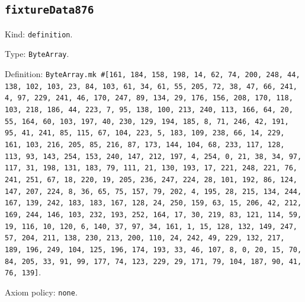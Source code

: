 \documentclass[11pt]{article}
\begin{document}
\subsection*{\texttt{fixtureData876}}
\noindent Kind: \texttt{definition}.\par
\noindent Type: \texttt{ByteArray}.\par
\noindent Definition: \texttt{ByteArray.mk \#[161, 184, 158, 198, 14, 62, 74, 200, 248, 44, 138, 102, 103, 23, 84, 103, 61, 34, 61, 55, 205, 72, 38, 47, 66, 241, 4, 97, 229, 241, 46, 170, 247, 89, 134, 29, 176, 156, 208, 170, 118, 103, 218, 186, 44, 223, 7, 95, 138, 100, 213, 240, 113, 166, 64, 20, 55, 164, 60, 103, 197, 40, 230, 129, 194, 185, 8, 71, 246, 42, 191, 95, 41, 241, 85, 115, 67, 104, 223, 5, 183, 109, 238, 66, 14, 229, 161, 103, 216, 205, 85, 216, 87, 173, 144, 104, 68, 233, 117, 128, 113, 93, 143, 254, 153, 240, 147, 212, 197, 4, 254, 0, 21, 38, 34, 97, 117, 31, 198, 131, 183, 79, 111, 21, 130, 193, 17, 221, 248, 221, 76, 241, 251, 67, 18, 220, 19, 205, 236, 247, 224, 28, 101, 192, 86, 124, 147, 207, 224, 8, 36, 65, 75, 157, 79, 202, 4, 195, 28, 215, 134, 244, 167, 139, 242, 183, 183, 167, 128, 24, 250, 159, 63, 15, 206, 42, 212, 169, 244, 146, 103, 232, 193, 252, 164, 17, 30, 219, 83, 121, 114, 59, 19, 116, 10, 120, 6, 140, 37, 97, 34, 161, 1, 15, 128, 132, 149, 247, 57, 204, 211, 138, 230, 213, 200, 110, 24, 242, 49, 229, 132, 217, 189, 196, 249, 104, 125, 196, 174, 193, 33, 46, 107, 8, 0, 20, 15, 70, 84, 205, 33, 91, 99, 177, 74, 123, 229, 29, 171, 79, 104, 187, 90, 41, 76, 139]}.\par
\noindent Axiom policy: \texttt{none}.\par
\end{document}
